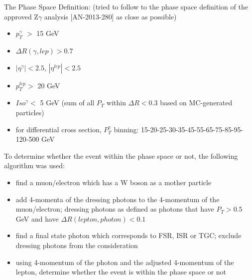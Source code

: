
The Phase Space Definition:
  (tried to follow to the phase space definition of the approved Z$\gamma$ analysis [AN-2013-280] as close as possible)
  \begin{itemize}
  \item $p_T^{\gamma}$ $>$ 15 GeV
  \item $\Delta{R}(\gamma,lep) > 0.7$
  \item $|\eta^{\gamma}|<2.5$, $|\eta^{lep}|<2.5$
  \item $p_T^{lep}>$ 20 GeV
  \item $Iso^{\gamma}<$ 5 GeV (sum of all $P_T$ within $\Delta{R}<$0.3 based on MC-generated particles)
  \item for differential cross section, $P_T^{\gamma}$ binning: 15-20-25-30-35-45-55-65-75-85-95-120-500 GeV
  \end{itemize}

To determine whether the event within the phase space or not, the following algorithm was used:
\begin{itemize}
   \item find a muon/electron which has a W boson as a mother particle
   \item add 4-momenta of the dressing photons to the 4-momentum of the muon/electron; dressing photons as defined as photons that have $P_T>0.5$ GeV and have $\Delta R(lepton,photon)<0.1$
   \item find a final state photon which corresponds to FSR, ISR or TGC; exclude dressing photons from the consideration
   \item using 4-momentum of the photon and the adjusted 4-momentum of the lepton, determine whether the event is within the phase space or not
\end{itemize}

